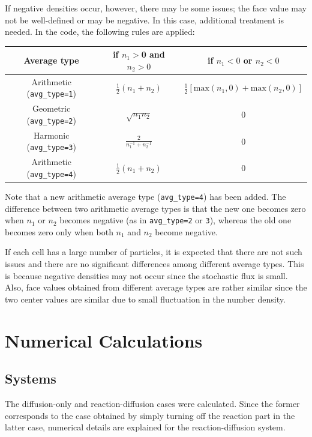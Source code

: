 \documentclass{article}
\begin{document}
If negative densities occur, however, there may be some issues; the face value may not be well-defined or may be negative.
In this case, additional treatment is needed.
In the code, the following rules are applied:
\begin{center}
{\tabulinesep=1.2mm
\begin{tabu}{|c|c|c|}
\hline
Average type & if $n_1>$0 and $n_2>0$ & if $n_1<0$ or $n_2<0$ \\
\hline
Arithmetic (\texttt{avg\_type=1}) & $\frac{1}{2}(n_1+n_2)$ & $\frac{1}{2}\left[\mathrm{max}(n_1,0)+\mathrm{max}(n_2,0)\right]$ \\
\hline
Geometric (\texttt{avg\_type=2}) & $\sqrt{n_1 n_2}$ & 0 \\
\hline
Harmonic (\texttt{avg\_type=3}) & $\frac{2}{n_1^{-1}+n_2^{-1}}$ & 0 \\
\hline
Arithmetic (\texttt{avg\_type=4}) & $\frac{1}{2}(n_1+n_2)$ & 0 \\
\hline
\end{tabu}
}
\end{center}
Note that a new arithmetic average type (\texttt{avg\_type=4}) has been added.
The difference between two arithmetic average types is that the new one becomes zero when $n_1$ or $n_2$ becomes negative (as in \texttt{avg\_type=2} or \texttt{3}), whereas the old one becomes zero only when both $n_1$ and $n_2$ become negative.

If each cell has a large number of particles, it is expected that there are not such issues and there are no significant differences among different average types.
This is because negative densities may not occur since the stochastic flux is small.
Also, face values obtained from different average types are rather similar since the two center values are similar due to small fluctuation in the number density.

\section{Numerical Calculations}

\subsection{Systems}

The diffusion-only and reaction-diffusion cases were calculated.
Since the former corresponds to the case obtained by simply turning off the reaction part in the latter case, numerical details are explained for the reaction-diffusion system.
\end{document}
